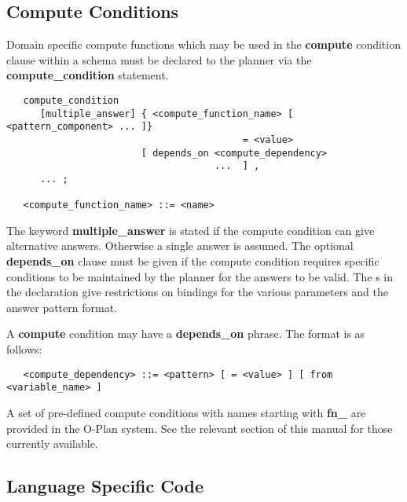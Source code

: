 \subsection{Compute Conditions}

Domain specific compute functions which may be used in the {\bf compute}
condition clause within a schema must be declared to the planner via the {\bf
compute\_condition} statement.


\begin{verbatim}
   compute_condition
      [multiple_answer] { <compute_function_name> [ <pattern_component> ... ]}
                                          = <value>
                        [ depends_on <compute_dependency>
                                     ...  ] ,
      ... ;

   <compute_function_name> ::= <name>
\end{verbatim}

The keyword {\bf multiple\_answer} is stated if
the compute condition can give alternative answers.  Otherwise a single
answer is assumed.  The optional {\bf depends\_on}
clause must be given if the compute condition requires specific
conditions to be maintained by the planner for the answers to be valid. 
The s in the declaration give restrictions on bindings for
the various parameters and the answer pattern format. 

A {\bf compute} condition may have a {\bf depends\_on} phrase.  The
format is as follows:

\begin{verbatim}
   <compute_dependency> ::= <pattern> [ = <value> ] [ from <variable_name> ]
\end{verbatim}

A set of pre-defined compute conditions with names starting with {\bf
fn\_} are provided in the O-Plan system.  See the relevant
section of this manual for those currently available. 

\subsection{Language Specific Code}

